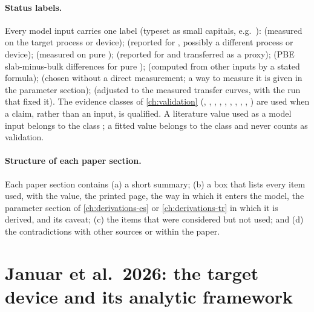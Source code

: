\paragraph{Status labels.}
Every model input carries one label (typeset as small capitals, e.g.\ ):
 (measured on the target process or device);
 (reported for \IWO, possibly a different process or device);
 (measured on pure \InO{});
 (reported for \InO{} and transferred as a proxy);
 (PBE slab-minus-bulk differences for pure \InO{});
 (computed from other inputs by a stated formula);
 (chosen without a direct measurement; a way to measure it is given in the parameter section);
 (adjusted to the measured transfer curves, with the run that fixed it).
The evidence classes of \cref{ch:validation} (\evDATA, \evNUM, \evCAL, \evOOS, \evPOST, \evPRED,
\evSURR, \evTHEORY, \evLIT, \evCORR) are used when a claim, rather than an input, is qualified. A
literature value used as a model input belongs to the class \evLIT; a fitted value belongs to the
class \evCAL{} and never counts as validation.

\paragraph{Structure of each paper section.}
Each paper section contains (a) a short summary; (b) a box that lists every item used, with the value,
the printed page, the way in which it enters the model, the parameter section of
\cref{ch:derivations-es} or \cref{ch:derivations-tr} in which it is derived, and its caveat; (c) the
items that were considered but not used; and (d) the contradictions with other sources or within the
paper.

\section{Januar et al.\ 2026: the target device and its analytic framework}\label{sec:lit-januar}

